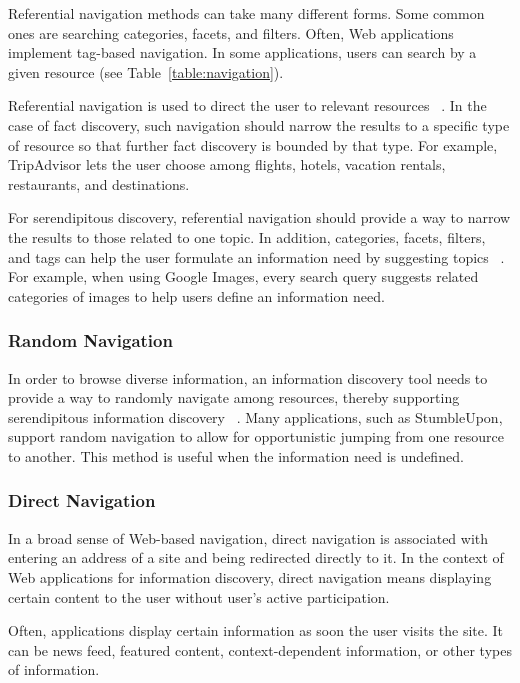 {{{Referential navigation methods can take many different forms. Some common ones are searching categories, facets, and filters. Often, Web applications implement tag-based navigation. In some applications, users can search by a given resource (see Table~\ref{table:navigation}).

Referential navigation is used to direct the user to relevant resources ~\cite{levene}. In the case of fact discovery, such navigation should narrow the results to a specific type of resource so that further fact discovery is bounded by that type. For example, TripAdvisor lets the user choose among flights, hotels, vacation rentals, restaurants, and destinations.

For serendipitous discovery, referential navigation should provide a way to narrow the results to those related to one topic. In addition, categories, facets, filters, and tags can help the user formulate an information need by suggesting topics ~\cite{levene}. For example, when using Google Images, every search query suggests related categories of images to help users define an information need.

} %

{\subsubsection{Random Navigation}
In order to browse diverse information, an information discovery tool needs to provide a way to randomly navigate among resources, thereby supporting serendipitous information discovery ~\cite{foster}. Many applications, such as StumbleUpon, support random navigation to allow for opportunistic jumping from one resource to another. This method is useful when the information need is undefined.


} %

{\subsubsection{Direct Navigation}
In a broad sense of Web-based navigation, direct navigation is associated with entering an address of a site and being redirected directly to it. In the context of Web applications for information discovery, direct navigation means displaying certain content to the user without user's active participation.  

Often, applications display certain information as soon the user visits the site. It can be news feed, featured content, context-dependent information, or other types of information. 

}}}
